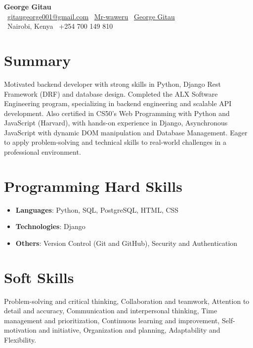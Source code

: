 \documentclass[letterpaper,11pt]{article}
\newcommand{\resumeSubHeadingListStart}{\begin{itemize}[leftmargin=*]}
\newcommand{\resumeSubHeadingListEnd}{\end{itemize}}
\begin{document}
\begin{center}
    {\huge \textbf{George Gitau}} \\
    \smallskip
     \faEnvelope\ \href{mailto:gitaugeorge001@gmail.com}{gitaugeorge001@gmail.com} \quad
     \faGithub\ \href{https://github.com/Mr-waweru}{Mr-waweru} \quad
     \faLinkedin\ \href{https://www.linkedin.com/in/mr-gitau/}{George Gitau} \\
    \smallskip
     \faMapMarker\ Nairobi, Kenya \quad \faMobile\ +254 700 149 810
\end{center}
\smallskip

\section*{Summary}
Motivated backend developer with strong skills in Python, Django Rest Framework (DRF) and database design. Completed the ALX Software Engineering program, specializing in backend engineering and scalable API development. Also certified in CS50’s Web Programming with Python and JavaScript (Harvard), with hands-on experience in Django, Asynchronous JavaScript with dynamic DOM manipulation and Database
Management. Eager to apply problem-solving and technical skills to real-world challenges in a professional environment.

\section*{Programming Hard Skills}
\resumeSubHeadingListStart
  \item{
    \textbf{Languages}{: Python, SQL, PostgreSQL, HTML, CSS}
  }
  \item{
    \textbf{Technologies}{: Django}
  }
  \item{
    \textbf{Others}{: Version Control (Git and GitHub), Security and Authentication}
  }
\resumeSubHeadingListEnd

\section*{Soft Skills}
Problem-solving and critical thinking, Collaboration and teamwork, Attention to detail and accuracy, Communication and interpersonal thinking, Time management and prioritization, Continuous learning and improvement, Self-motivation and initiative, Organization and planning, Adaptability and Flexibility.
\end{document}
